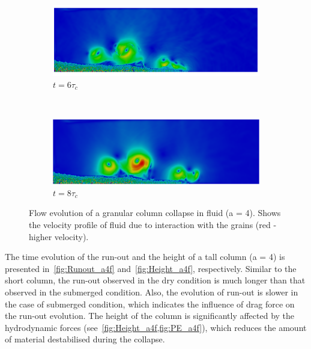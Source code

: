 \begin{figure}
\ContinuedFloat
\begin{subfigure}[b]{0.975\textwidth}
	\centering
    \includegraphics[width=\textwidth]{a4/a4_6tc}
    \caption*{$t = 6\tau_c$}
    \label{fig:a4_6tc}
\end{subfigure}
\\
\begin{subfigure}[b]{0.975\textwidth}
	\centering
    \includegraphics[width=\textwidth]{a4/a4_8tc}
    \caption*{$t = 8\tau_c$}
    \label{fig:a4_8tc}
\end{subfigure}

\caption{Flow evolution of a granular column collapse in fluid (a = 4). Shows 
the velocity profile of fluid due to interaction with the grains (red - higher 
velocity).}
\label{fig:a4_snapshots}
\end{figure}

The time evolution of the run-out and the height of a tall column (a = 4) is 
presented in~\cref{fig:Runout_a4f} and~\cref{fig:Height_a4f}, respectively. 
Similar to the short column, the run-out observed in the dry condition is much 
longer than that observed in the submerged condition. Also, the evolution of 
run-out is slower in the case of submerged condition, which indicates the 
influence of drag force on the run-out evolution. The height of the column is 
significantly affected by the hydrodynamic forces 
(see~\cref{fig:Height_a4f,fig:PE_a4f}), which reduces the amount of material 
destabilised during the collapse.  


